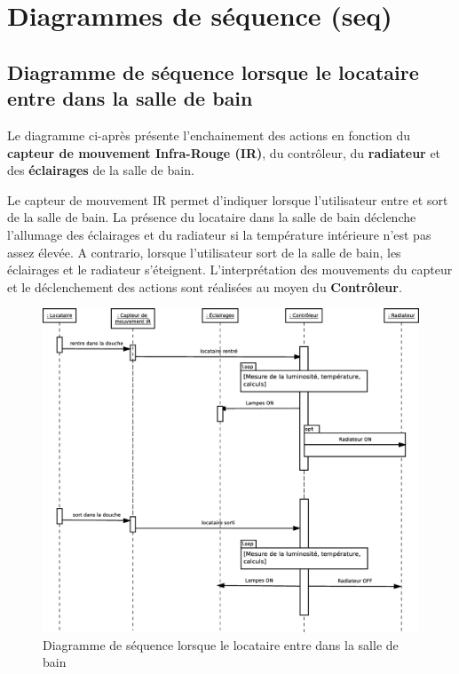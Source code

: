 \chapter{Diagrammes de séquence (seq)}
\section{Diagramme de séquence lorsque le locataire entre dans la salle de bain}
Le diagramme ci-après présente l'enchainement des actions en fonction du \textbf{capteur de mouvement Infra-Rouge (IR)}, du contrôleur, du \textbf{radiateur} et des \textbf{éclairages} de la salle de bain.

Le capteur de mouvement IR permet d'indiquer lorsque l'utilisateur entre et sort de la salle de bain. La présence du locataire dans la salle de bain déclenche l'allumage des éclairages et du radiateur si la température intérieure n'est pas assez élevée. A contrario, lorsque l'utilisateur sort de la salle de bain, les éclairages et le radiateur s'éteignent. L'interprétation des mouvements du capteur et le déclenchement des actions sont réalisées au moyen du \textbf{Contrôleur}.

\begin{figure}[H]
	\centering
	\includegraphics[width=1\linewidth]{diagrams/bathroom/diagramme_sequence.eps}
	\caption{Diagramme de séquence lorsque le locataire entre dans la salle de bain}
	\label{fig:diagramme_seq1}
\end{figure}
\pagebreak

